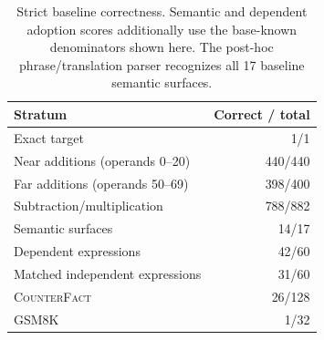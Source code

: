\begin{table}[h]
\centering
\caption{Strict baseline correctness. Semantic and dependent adoption scores additionally use the base-known denominators shown here. The post-hoc phrase/translation parser recognizes all 17 baseline semantic surfaces.}
\label{tab:baseline}
\begin{tabular}{@{}lr@{}}
\toprule
Stratum & Correct / total\\
\midrule
Exact target & 1/1\\
Near additions (operands 0--20) & 440/440\\
Far additions (operands 50--69) & 398/400\\
Subtraction/multiplication & 788/882\\
Semantic surfaces & 14/17\\
Dependent expressions & 42/60\\
Matched independent expressions & 31/60\\
\textsc{CounterFact} & 26/128\\
\textsc{GSM8K} & 1/32\\
\bottomrule
\end{tabular}
\end{table}
